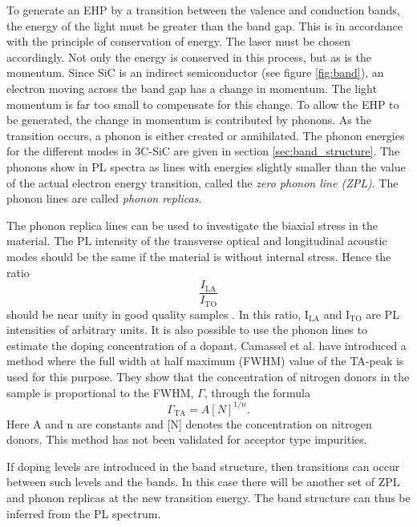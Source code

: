 To generate an EHP by a transition between the valence and conduction bands, the energy of the light must be greater than the band gap. This is in accordance with the principle of conservation of energy. The laser must be chosen accordingly. Not only the energy is conserved in this process, but as is the momentum. Since SiC is an indirect semiconductor (see figure \ref{fig:band}), an electron moving across the band gap has a change in momentum. The light momentum is far too small to compensate for this change. To allow the EHP to be generated, the change in momentum is contributed by phonons. As the transition occurs, a phonon is either created or annihilated. The phonon energies for the different modes in 3C-SiC are given in section \ref{sec:band_structure}. The phonons show in PL spectra as lines with energies slightly smaller than the value of the actual electron energy transition, called the \emph{zero phonon line (ZPL)}. The phonon lines are called \emph{phonon replicas}. 

The phonon replica lines can be used to investigate the biaxial stress in the material. The PL intensity of the transverse optical and longitudinal acoustic modes should be the same if the material is without internal stress. Hence the ratio 
\[\frac{I_{\mathrm{LA}}}{I_{\mathrm{TO}}}\]
should be near unity in good quality samples \cite{Sun2012b}. In this ratio, I$_\mathrm{LA}$ and I$_\mathrm{TO}$ are PL intensities of arbitrary units. It is also possible to use the phonon lines to estimate the doping concentration of a dopant. Camassel et al. have introduced a method where the full width at half maximum (FWHM) value of the TA-peak is used for this purpose. They show that the concentration of nitrogen donors in the sample is proportional to the FWHM, $\Gamma$, through the formula
\begin{equation}
\label{eq:fwhm}
\Gamma_\mathrm{TA} = A[N]^{1/n}.
\end{equation}
Here A and n are constants and [N] denotes the concentration on nitrogen donors. This method has not been validated for acceptor type impurities. 


If doping levels are introduced in the band structure, then transitions can occur between such levels and the bands. In this case there will be another set of ZPL and phonon replicas at the new transition energy. The band structure can thus be inferred from the PL spectrum. 

